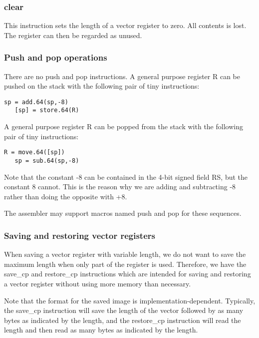 \documentclass[forwardcom.tex]{subfiles}
\begin{document}
\subsubsection{clear}
This instruction sets the length of a vector register to zero. All contents is lost. The register can then be regarded as unused.

\subsubsection{Push and pop operations}
There are no push and pop instructions. A general purpose register R can be pushed on the stack with the following pair of tiny instructions:

\begin{lstlisting}[frame=none]
   sp = add.64(sp,-8)
   [sp] = store.64(R)
\end{lstlisting}

A general purpose register R can be popped from the stack with the following pair of tiny instructions:

\begin{lstlisting}[frame=none]
   R = move.64([sp])
   sp = sub.64(sp,-8)
\end{lstlisting}

Note that the constant -8 can be contained in the 4-bit signed field RS, but the constant 8 cannot. This is the reason why we are adding and subtracting -8 rather than doing the opposite with +8.
\vspace{2mm}

The assembler may support macros named push and pop for these sequences.

\subsubsection{Saving and restoring vector registers} \label{saveRestoreVectorRegisters}
When saving a vector register with variable length, we do not want to save the maximum length when only part of the register is used. Therefore, we have the save\_cp and restore\_cp instructions which are intended for saving and restoring a vector register without using more memory than necessary.
\vspace{2mm}

Note that the format for the saved image is implementation-dependent. Typically, the save\_cp instruction will save the length of the vector followed by as many bytes as indicated by the length, and the restore\_cp instruction will read the length and then read as many bytes as indicated by the length. 
\vspace{2mm}
\end{document}
